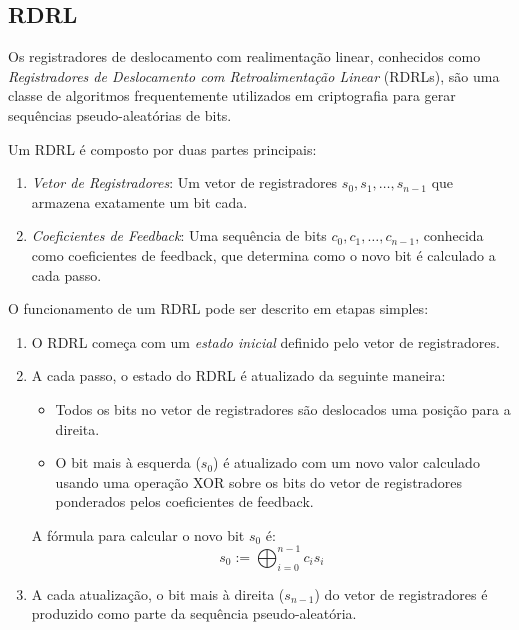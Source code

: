 \subsection{RDRL}
\label{sec:lfsr}

Os registradores de deslocamento com realimentação linear, conhecidos como {\em Registradores de Deslocamento com Retroalimentação Linear} (RDRLs), são uma classe de algoritmos frequentemente utilizados em criptografia para gerar sequências pseudo-aleatórias de bits.

Um RDRL é composto por duas partes principais:
\begin{enumerate}
    \item[] {\em Vetor de Registradores}: Um vetor de registradores \(s_0, s_1, \dots, s_{n-1}\) que armazena exatamente um bit cada.
    \item[] {\em Coeficientes de Feedback}: Uma sequência de bits \(c_0, c_1, \dots, c_{n-1}\), conhecida como coeficientes de feedback, que determina como o novo bit é calculado a cada passo.
\end{enumerate}

O funcionamento de um RDRL pode ser descrito em etapas simples:

\begin{enumerate}
    \item O RDRL começa com um {\em estado inicial} definido pelo vetor de registradores.
    \item A cada passo, o estado do RDRL é atualizado da seguinte maneira:
    \begin{itemize}
        \item Todos os bits no vetor de registradores são deslocados uma posição para a direita.
        \item O bit mais à esquerda ($s_0$) é atualizado com um novo valor calculado usando uma operação XOR sobre os bits do vetor de registradores ponderados pelos coeficientes de feedback.
    \end{itemize}
    A fórmula para calcular o novo bit $s_0$ é:
    \begin{displaymath}
    s_0 := \bigoplus_{i=0}^{n-1} c_i s_i
    \end{displaymath}

    \item A cada atualização, o bit mais à direita ($s_{n-1}$) do vetor de registradores é produzido como parte da sequência pseudo-aleatória.
\end{enumerate}

